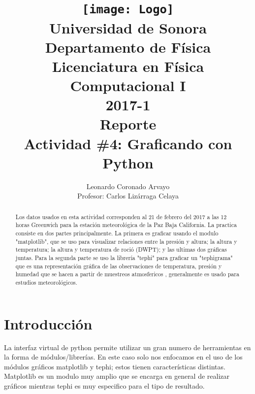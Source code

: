 \documentclass[12pt,letterpaper]{article}
\author{
Leonardo Coronado Arvayo\\
Profesor: Carlos Lizárraga Celaya   \vspace*{1.25in}}
\title{	\texttt{[image: Logo]} \\
Universidad de Sonora \\
{\small Departamento de Física \\
Licenciatura en Física \\
Computacional I \\
2017-1 \\
\vspace{0.55in} Reporte}\\ 
{\Huge Actividad \#4: Graficando con Python}\\
\vspace*{1.0in}}
\begin{document}
	\maketitle
\newpage
	\tableofcontents
\pagebreak

\begin{abstract}

Los datos usados en esta actividad corresponden al 21 de febrero del 2017 a las 12 horas Greenwich para la estación meteorológica de la Paz Baja California. La practica consiste en dos partes principalmente. La primera es graficar usando el modulo "matplotlib", que se uso para visualizar relaciones entre la presión y altura; la altura y temperatura; la altura y temperatura de roció (DWPT); y las ultimas dos gráficas juntas.  Para la segunda parte se uso la librería "tephi" para graficar un "tephigrama" que es una representación gráfica de las observaciones de temperatura, presión y humedad que se hacen a partir de muestreos atmosfericos \cite{f}, generalmente es usado para estudios meteorológicos.



\end{abstract}


\section{Introducción}

La interfaz virtual de python permite utilizar un gran numero de herramientas en la forma de módulos/librerías. En este caso solo nos enfocamos en el uso de los módulos gráficos matplotlib y tephi; estos tienen características distintas. Matplotlib es un modulo muy amplio que se encarga en general de realizar gráficos mientras tephi es muy especifico para el tipo de resultado.\\
\end{document}
